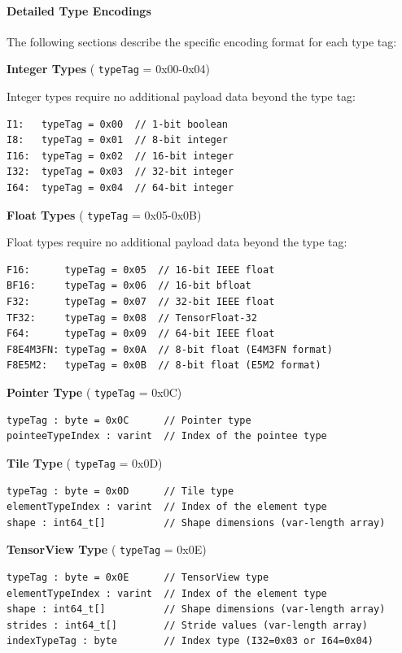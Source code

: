 \documentclass{article}
\begin{document}
\paragraph{Detailed Type Encodings}

The following sections describe the specific encoding format for each type tag:


\textbf{Integer Types} ( \texttt{typeTag} = 0x00-0x04)


Integer types require no additional payload data beyond the type tag:


\begin{lstlisting}
I1:   typeTag = 0x00  // 1-bit boolean
I8:   typeTag = 0x01  // 8-bit integer
I16:  typeTag = 0x02  // 16-bit integer
I32:  typeTag = 0x03  // 32-bit integer
I64:  typeTag = 0x04  // 64-bit integer
\end{lstlisting}

\textbf{Float Types} ( \texttt{typeTag} = 0x05-0x0B)


Float types require no additional payload data beyond the type tag:


\begin{lstlisting}
F16:      typeTag = 0x05  // 16-bit IEEE float
BF16:     typeTag = 0x06  // 16-bit bfloat
F32:      typeTag = 0x07  // 32-bit IEEE float
TF32:     typeTag = 0x08  // TensorFloat-32
F64:      typeTag = 0x09  // 64-bit IEEE float
F8E4M3FN: typeTag = 0x0A  // 8-bit float (E4M3FN format)
F8E5M2:   typeTag = 0x0B  // 8-bit float (E5M2 format)
\end{lstlisting}

\textbf{Pointer Type} ( \texttt{typeTag} = 0x0C)


\begin{lstlisting}
typeTag : byte = 0x0C      // Pointer type
pointeeTypeIndex : varint  // Index of the pointee type
\end{lstlisting}

\textbf{Tile Type} ( \texttt{typeTag} = 0x0D)


\begin{lstlisting}
typeTag : byte = 0x0D      // Tile type
elementTypeIndex : varint  // Index of the element type
shape : int64_t[]          // Shape dimensions (var-length array)
\end{lstlisting}

\textbf{TensorView Type} ( \texttt{typeTag} = 0x0E)


\begin{lstlisting}
typeTag : byte = 0x0E      // TensorView type
elementTypeIndex : varint  // Index of the element type
shape : int64_t[]          // Shape dimensions (var-length array)
strides : int64_t[]        // Stride values (var-length array)
indexTypeTag : byte        // Index type (I32=0x03 or I64=0x04)
\end{lstlisting}
\end{document}
